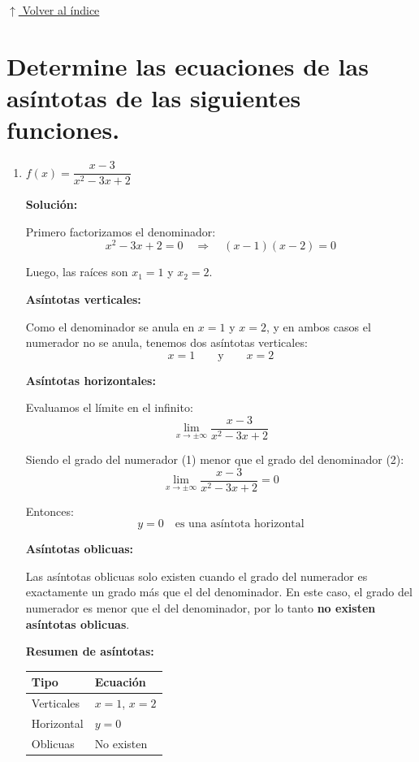 \documentclass[12pt]{article}
\newcommand{\solucion}{%
    \vspace{0.8em}%
    \textbf{Solución:}%
}
\newcommand{\volverindice}{%
    \vspace{1em}%
    \begin{flushright}%
        \hyperlink{indice}{\small $\uparrow$ Volver al índice}%
    \end{flushright}%
}
\begin{document}
\volverindice
\newpage

\section[Asíntotas]{Determine las ecuaciones de las asíntotas de las siguientes funciones.}

\begin{enumerate}[label=\alph*)]

    \item $f(x) = \dfrac{x-3}{x^2 - 3x + 2}$

    \solucion

    Primero factorizamos el denominador:
    \[
    x^2 - 3x + 2 = 0 \quad \Rightarrow \quad (x-1)(x-2) = 0
    \]

    Luego, las raíces son $x_1 = 1$ y $x_2 = 2$.

    \textbf{Asíntotas verticales:}

    Como el denominador se anula en $x = 1$ y $x = 2$, y en ambos casos el numerador no se anula, tenemos dos asíntotas verticales:
    \[
    \boxed{x = 1} \qquad \text{y} \qquad \boxed{x = 2}
    \]

    \textbf{Asíntotas horizontales:}

    Evaluamos el límite en el infinito:
    \[
    \lim_{x \to \pm\infty} \frac{x-3}{x^2 - 3x + 2}
    \]

    Siendo el grado del numerador (1) menor que el grado del denominador (2):
    \[
    \lim_{x \to \pm\infty} \frac{x-3}{x^2 - 3x + 2} = 0
    \]

    Entonces:
    \[
    \boxed{y = 0} \quad \text{es una asíntota horizontal}
    \]

    \textbf{Asíntotas oblicuas:}

    Las asíntotas oblicuas solo existen cuando el grado del numerador es exactamente un grado más que el del denominador. En este caso, el grado del numerador es menor que el del denominador, por lo tanto \textbf{no existen asíntotas oblicuas}.

    \vspace{0.5em}
    \textbf{Resumen de asíntotas:}

    \begin{center}
    \begin{tabular}{ll}
        \toprule
        Tipo & Ecuación \\
        \midrule
        Verticales & $x = 1$, $x = 2$ \\
        Horizontal & $y = 0$ \\
        Oblicuas & No existen \\
        \bottomrule
    \end{tabular}
    \end{center}


\end{enumerate}
\end{document}
